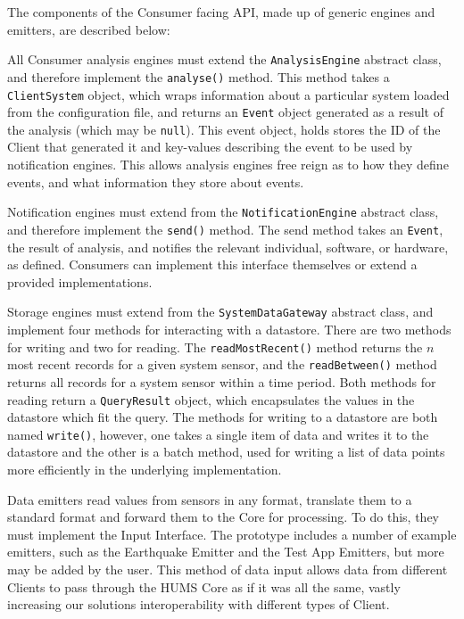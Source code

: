\documentclass[10pt,a4paper]{article}
\begin{document}
The components of the Consumer facing API, made up of generic engines and emitters, are described below:
\begin{description} [noitemsep]	
	\item[Analysis Engines] All Consumer analysis engines must extend the \texttt{AnalysisEngine} abstract class, and therefore implement the \texttt{analyse()} method. This method takes a \texttt{ClientSystem} object, which wraps information about a particular system loaded from the configuration file, and returns an \texttt{Event} object generated as a result of the analysis (which may be \texttt{null}). This event object, holds stores the ID of the Client that generated it and key-values describing the event to be used by notification engines. This allows analysis engines free reign as to how they define events, and what information they store about events.
	\item[Notification Engines] Notification engines must extend from the \texttt{NotificationEngine} abstract class, and therefore implement the \texttt{send()} method. The send method takes an \texttt{Event}, the result of analysis, and notifies the relevant individual, software, or hardware, as defined. Consumers can implement this interface themselves or extend a provided implementations.
	\item[Storage Engines] Storage engines must extend from the \texttt{SystemDataGateway} abstract class, and implement four methods for interacting with a datastore. There are two methods for writing and two for reading. The \texttt{readMostRecent()} method returns the $n$ most recent records for a given system sensor, and the \texttt{readBetween()} method returns all records for a system sensor within a time period. Both methods for reading return a \texttt{QueryResult} object, which encapsulates the values in the datastore which fit the query. The methods for writing to a datastore are both named \texttt{write()}, however, one takes a single item of data and writes it to the datastore and the other is a batch method, used for writing a list of data points more efficiently in the underlying implementation. 
	\item[Data Emitters] Data emitters read values from sensors in any format, translate them to a standard format and forward them to the Core for processing. To do this, they must implement the Input Interface. The prototype includes a number of example emitters, such as the Earthquake Emitter and the Test App Emitters, but more may be added by the user. This method of data input allows data from different Clients to pass through the HUMS Core as if it was all the same, vastly increasing our solutions interoperability with different types of Client.
\end{description}
\end{document}
